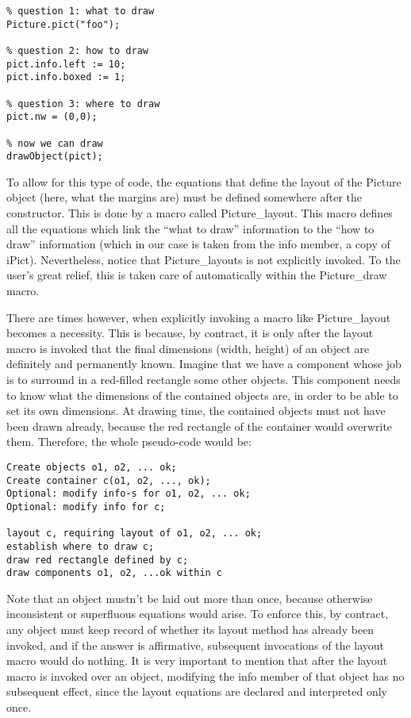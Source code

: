 \documentclass{article}
\newcommand{\code}{\ttfamily}
\begin{document}
\begin{verbatim}
% question 1: what to draw
Picture.pict("foo");

% question 2: how to draw
pict.info.left := 10;
pict.info.boxed := 1;

% question 3: where to draw
pict.nw = (0,0);

% now we can draw
drawObject(pict);
\end{verbatim}

To allow for this type of code, the equations that define the layout of the {\code Picture} object (here, what the margins are)
must be defined somewhere after the constructor. This is done by a macro called {\code Picture\_layout}.
This macro defines all the equations which link the ``what to draw'' information to the ``how to draw''
information (which in our case is taken from the {\code info} member, a copy of {\code iPict}).
Nevertheless, notice that {\code Picture\_layouts} is not explicitly invoked. To the user's
great relief, this is taken care of automatically within the {\code Picture\_draw} macro.

There are times however, when explicitly invoking a macro like {\code Picture\_layout}
becomes a necessity. This is because, by contract, it is only after the {\code layout}
macro is invoked that the final dimensions (width, height) of an object are
definitely and permanently known. Imagine that we have a component whose job is to
surround in a red-filled rectangle some other objects. This component
needs to know what the dimensions of the contained objects are, in order to be able to set
its own dimensions. At drawing time, the contained objects must not have been drawn already,
because the red rectangle of the container would overwrite them.
Therefore, the whole pseudo-code would be:
\begin{verbatim}
Create objects o1, o2, ... ok;
Create container c(o1, o2, ..., ok);
Optional: modify info-s for o1, o2, ... ok;
Optional: modify info for c;

layout c, requiring layout of o1, o2, ... ok;
establish where to draw c;
draw red rectangle defined by c;
draw components o1, o2, ...ok within c
\end{verbatim}

Note that an object mustn't be laid out more than once, because otherwise
inconsistent or superfluous equations would arise. To enforce this, by contract,
any object must keep record of whether its layout method has already been invoked,
and if the answer is affirmative, subsequent invocations of the layout macro would
do nothing. It is very important to mention that after the {\code layout} macro is
invoked over an object, modifying the {\code info} member of that object has
no subsequent effect, since the layout equations are declared and interpreted only once.
\end{document}

